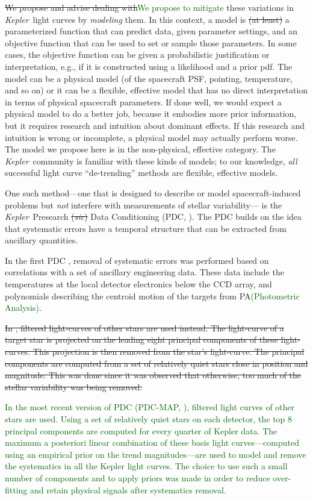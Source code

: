 \documentclass[12pt, preprint]{aastex}
\newcommand{\notenglish}[1]{\textit{#1}}
\newcommand{\sic}{\notenglish{sic}}
\newcommand{\project}[1]{\textsl{#1}}
\newcommand{\Kepler}{\project{Kepler}}
\newcommand{\revise}[1]{\textcolor{darkgreen}{#1}}
\newcommand{\remove}[1]{\sout{#1}}
\begin{document}
\remove{We propose and advise dealing with}\revise{We propose to mitigate} these variations in \Kepler\ light curves by \emph{modeling} them.
In this context, a model is \remove{(at least)} a parameterized function that can predict data, given parameter settings,
  and an objective function that can be used to set or sample those parameters.
In some cases, the objective function can be given a probabilistic justification or interpretation, e.g., if it is constructed using a likelihood and a prior pdf.
The model can be a physical model (of the spacecraft PSF, pointing, temperature, and so on)
  or it can be a flexible, effective model that has no direct interpretation in terms of physical spacecraft parameters.
If done well, we would expect a physical model to do a better job,
  because it embodies more prior information,
  but it requires research and intuition about dominant effects. 
If this research and intuition is wrong or incomplete, a physical model may actually perform worse.
The model we propose here is in the non-physical, effective category.
The \Kepler\ community is familiar with these kinds of models; to our knowledge, \emph{all} successful light curve ``de-trending'' methods are flexible, effective models.

One such method---one that is designed to describe or model spacecraft-induced problems
  but \emph{not} interfere with measurements of stellar variability---%
  is the \Kepler\ Presearch \remove{(\sic)} Data Conditioning (PDC, \citealt{pdc1}).
The PDC builds on the idea that systematic errors have a temporal structure that can be extracted from ancillary quantities. 

In the first PDC \citep{pdc1}, 
  removal of systematic errors was performed based on correlations with a set of ancillary engineering data. 
These data include the temperatures at the local detector electronics below the CCD array, 
  and polynomials describing the centroid motion of the targets from PA\revise{(Photometric Analysis)}.

\remove{In \cite{pdc2,pdc3}, filtered light-curves of other stars are used instead. 
The light-curve of a target star is projected on the leading eight principal components of these light-curves. 
This projection is then removed from the star's light-curve. 
The principal components are computed from a set of relatively quiet stars close in position and magnitude. 
This was done since it was observed that otherwise, too much of the stellar variability was being removed.}

\revise{In the most recent version of PDC (PDC-MAP, \citealt{pdc2,pdc3}), filtered light curves of other stars are used. Using a set of relatively quiet stars on each detector, the
top 8 principal components are computed for every quarter of Kepler
data. The maximum a posteriori linear combination of these basis light
curves---computed using an empirical prior on the trend
magnitudes---are used to model and remove the systematics in all the
Kepler light curves. The choice to use such a small number of
components and to apply priors was made in order to reduce
over-fitting and retain physical signals after systematics removal.}
\end{document}
